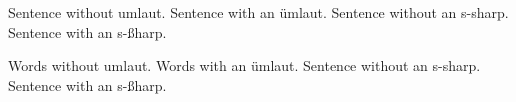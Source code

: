 \documentclass{article}
\begin{document}
\noindent
Sentence without umlaut.\newline
Sentence with an ümlaut.\newline
Sentence without an s-sharp.\newline
Sentence with an s-ßharp.\newline

\noindent
Words without umlaut.\newline
Words with an ümlaut.\newline
Sentence without an s-sharp.\newline
Sentence with an s-ßharp.\newline
\end{document}
